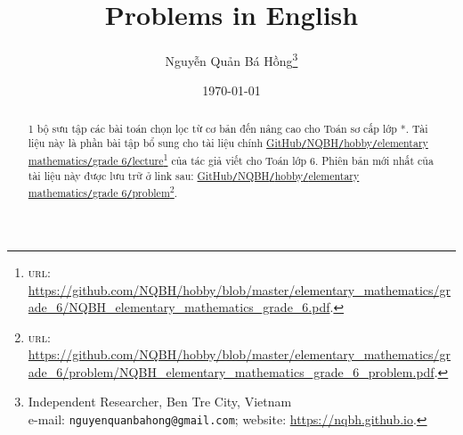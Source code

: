 \documentclass{article}
\title{Problems in English}
\author{Nguyễn Quản Bá Hồng\footnote{Independent Researcher, Ben Tre City, Vietnam\\e-mail: \texttt{nguyenquanbahong@gmail.com}; website: \url{https://nqbh.github.io}.}}
\date{\today}
\numberwithin{equation}{section}
\begin{document}
\maketitle
\begin{abstract}
	1 bộ sưu tập các bài toán chọn lọc từ cơ bản đến nâng cao cho Toán sơ cấp lớp *. Tài liệu này là phần bài tập bổ sung cho tài liệu chính \href{https://github.com/NQBH/hobby/blob/master/elementary_mathematics/grade_6/NQBH_elementary_mathematics_grade_6.pdf}{GitHub\texttt{/}NQBH\texttt{/}hobby\texttt{/}elementary mathematics\texttt{/}grade 6\texttt{/}lecture}\footnote{\textsc{url}: \url{https://github.com/NQBH/hobby/blob/master/elementary_mathematics/grade_6/NQBH_elementary_mathematics_grade_6.pdf}.} của tác giả viết cho Toán lớp 6. Phiên bản mới nhất của tài liệu này được lưu trữ ở link sau: \href{https://github.com/NQBH/hobby/blob/master/elementary_mathematics/grade_6/problem/NQBH_elementary_mathematics_grade_6_problem.pdf}{GitHub\texttt{/}NQBH\texttt{/}hobby\texttt{/}elementary mathematics\texttt{/}grade 6\texttt{/}problem}\footnote{\textsc{url}: \url{https://github.com/NQBH/hobby/blob/master/elementary_mathematics/grade_6/problem/NQBH_elementary_mathematics_grade_6_problem.pdf}.}.
\end{abstract}
\tableofcontents
\newpage

\end{document}
